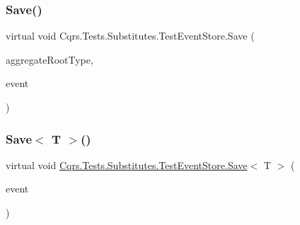 \mbox{\label{classCqrs_1_1Tests_1_1Substitutes_1_1TestEventStore_ac5f756c50e6af8df69313cd24f1c69f5_ac5f756c50e6af8df69313cd24f1c69f5}} 
\subsubsection{\texorpdfstring{Save()}{Save()}}
{\footnotesize\ttfamily virtual void Cqrs.\+Tests.\+Substitutes.\+Test\+Event\+Store.\+Save (\begin{DoxyParamCaption}\item[{Type}]{aggregate\+Root\+Type,  }\item[{\hyperlink{interfaceCqrs_1_1Events_1_1IEvent}{I\+Event}$<$ \hyperlink{interfaceCqrs_1_1Authentication_1_1ISingleSignOnToken}{I\+Single\+Sign\+On\+Token} $>$ @}]{event }\end{DoxyParamCaption})\hspace{0.3cm}{\ttfamily [virtual]}}

\mbox{\label{classCqrs_1_1Tests_1_1Substitutes_1_1TestEventStore_ab727c96e0f9a36729c1e10fabbef969f_ab727c96e0f9a36729c1e10fabbef969f}} 
\subsubsection{\texorpdfstring{Save$<$ T $>$()}{Save< T >()}}
{\footnotesize\ttfamily virtual void \hyperlink{classCqrs_1_1Tests_1_1Substitutes_1_1TestEventStore_ac5f756c50e6af8df69313cd24f1c69f5_ac5f756c50e6af8df69313cd24f1c69f5}{Cqrs.\+Tests.\+Substitutes.\+Test\+Event\+Store.\+Save}$<$ T $>$ (\begin{DoxyParamCaption}\item[{\hyperlink{interfaceCqrs_1_1Events_1_1IEvent}{I\+Event}$<$ \hyperlink{interfaceCqrs_1_1Authentication_1_1ISingleSignOnToken}{I\+Single\+Sign\+On\+Token} $>$ @}]{event }\end{DoxyParamCaption})\hspace{0.3cm}{\ttfamily [virtual]}}



